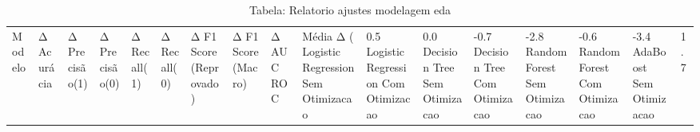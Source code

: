 \begin{table}[H] %
    \centering
    \caption{Tabela: Relatorio ajustes modelagem eda}
    \label{tab:relatorio_ajustes_modelagem_eda}
    \renewcommand{\arraystretch}{1.25} %
    \begin{adjustwidth}{ -1in }{ -1in } %
    \centering %
    \small %
    \begin{tabular}{lllllllllll}
\toprule
                            Modelo & Δ Acurácia & Δ Precisão(1) & Δ Precisão(0) & Δ Recall(1) & Δ Recall(0) & Δ F1 Score (Reprovado) & Δ F1 Score (Macro) & Δ AUC ROC & Média Δ (%
\midrule
Logistic Regression Sem Otimizacao &       0.5%
Logistic Regression Com Otimizacao &       0.0%
      Decision Tree Sem Otimizacao &      -0.7%
      Decision Tree Com Otimizacao &      -2.8%
      Random Forest Sem Otimizacao &      -0.6%
      Random Forest Com Otimizacao &      -3.4%
           AdaBoost Sem Otimizacao &       1.7%

\end{tabular}
\end{adjustwidth}
\end{table}

